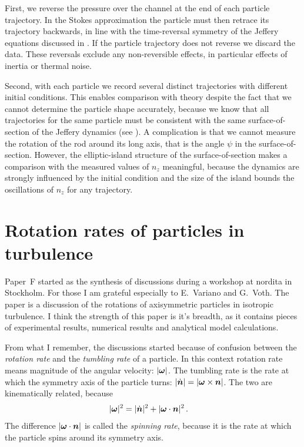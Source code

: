 \documentclass[thesis.tex]{subfiles}
\begin{document}
First, we reverse the pressure over the channel at the end of each particle trajectory. In the Stokes approximation the particle must then retrace its trajectory backwards, in line with the time-reversal symmetry of the Jeffery equations discussed in . If the particle trajectory does not reverse we discard the data. These reversals exclude any non-reversible effects, in particular effects of inertia or thermal noise. 

Second, with each particle we record several distinct trajectories with different initial conditions. This enables comparison with theory despite the fact that we cannot determine the particle shape accurately, because we know that all trajectories for the same particle must be consistent with the same surface-of-section of the Jeffery dynamics (see ). A complication is that we cannot measure the rotation of the rod around its long axis, that is the angle $\psi$ in the surface-of-section. However, the elliptic-island structure of the surface-of-section makes a comparison with the measured values of $n_z$ meaningful, because the dynamics are strongly influenced by the initial condition and the size of the island bounds the oscillations of $n_z$ for any trajectory.

\chapter{Rotation rates of particles in turbulence}
Paper~F started as the synthesis of discussions during a workshop at {\sc nordita} in Stockholm. For those I am grateful especially to E.~Variano and G.~Voth. The paper is a discussion of the rotations of axisymmetric particles in isotropic turbulence. I think the strength of this paper is it's breadth, as it contains pieces of experimental results, numerical results and analytical model calculations.

From what I remember, the discussions started because of confusion between the \emph{rotation rate} and the \emph{tumbling rate} of a particle. In this context rotation rate means magnitude of the angular velocity: $|\mbox{\boldmath$\omega$}|$. The tumbling rate is the rate at which the symmetry axis of the particle turns: $|\dot{\mbox{\boldmath$n$}}|=|\mbox{\boldmath$\omega$} \times \mbox{\boldmath$n$}|$. The two are kinematically related, because
\begin{align}
    |\mbox{\boldmath$\omega$}|^2 &= |\dot{\mbox{\boldmath$n$}}|^2 + |\mbox{\boldmath$\omega$} \cdot \mbox{\boldmath$n$}|^2\,.
\end{align}
The difference $|\mbox{\boldmath$\omega$} \cdot \mbox{\boldmath$n$}|$ is called the \emph{spinning rate}, because it is the rate at which the particle spins around its symmetry axis.
\end{document}

